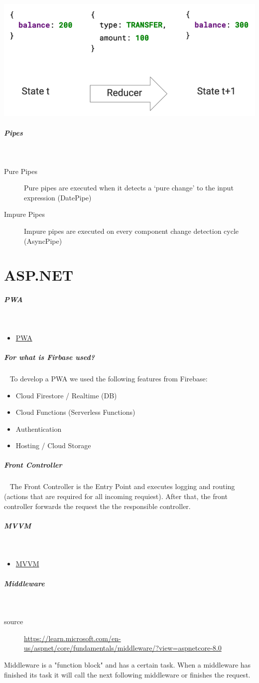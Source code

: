 \documentclass[11pt,twoside,landscape]{article}
\begin{document}
\begin{multicols}{3}
{
\begin{center}
\includegraphics[width=.9\linewidth]{img/redux_action_reducer.png}
\end{center}
\label{fig:action-reducer-state-change}
}
\subparagraph{Pipes} \
\label{sec:org036eb78}
\begin{description}
\item[{Pure Pipes}] Pure pipes are executed when it detects a ‘pure change’ to the input expression (DatePipe)
\item[{Impure Pipes}] Impure pipes are executed on every component change detection cycle (AsyncPipe)
\end{description}
\section{ASP.NET}
\label{sec:orgdc13d17}
\subparagraph{PWA} \
\label{sec:org777da44}
\begin{itemize}
\item \href{../../../roam/20240108155002-pwa.org}{PWA}
\end{itemize}
\subparagraph{For what is Firbase used?} \
\label{sec:org109dfb7}
To develop a PWA we used the following features from Firebase:
\begin{itemize}
\item Cloud Firestore / Realtime (DB)
\item Cloud Functions (Serverless Functions)
\item Authentication
\item Hosting / Cloud Storage
\end{itemize}
\subparagraph{Front Controller} \
\label{sec:org7d8d895}
The Front Controller is the Entry Point and executes logging and routing (actions that are required for all incoming requiest).
After that, the front controller forwards the request the the responsible controller.
\subparagraph{MVVM} \
\label{sec:org3caf99d}
\begin{itemize}
\item \href{../../../roam/20211103140901-mvvm.org}{MVVM}
\end{itemize}
\subparagraph{Middleware} \
\label{sec:orgee1b3d7}
\begin{description}
\item[{source}] \url{https://learn.microsoft.com/en-us/aspnet/core/fundamentals/middleware/?view=aspnetcore-8.0}
\end{description}
Middleware is a "function block" and has a certain task.
When a middleware has finished its task it will call the next following middleware or finishes the request.


\end{multicols}
\end{document}
